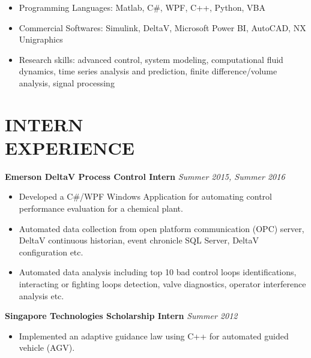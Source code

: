 \documentclass[margin, 9pt]{res}
\begin{document}
\begin{resume}
\vspace*{-2pt}
\begin{itemize}[leftmargin=*] \itemsep -4pt
	\item Programming Languages: Matlab, C\#, WPF,  C++, Python, VBA
	\item Commercial Softwares: Simulink, DeltaV, Microsoft Power BI, AutoCAD, NX Unigraphics
	\item Research skills: advanced control, system modeling, computational fluid dynamics, time series analysis and prediction, finite difference/volume analysis, signal processing
\end{itemize}


\section{INTERN\\ EXPERIENCE}

{\textbf{Emerson DeltaV Process Control Intern}} \hfill\textit{Summer 2015, Summer 2016}\\
\vspace*{-10pt}
\begin{itemize}[leftmargin=*] \itemsep -3pt
\vspace*{-5pt}
	\item Developed a C\#/WPF Windows Application for automating control performance evaluation for a chemical plant.
    \item Automated data collection from open platform communication (OPC) server, DeltaV continuous historian, event chronicle SQL Server,  DeltaV configuration etc.
	\item Automated data analysis including  top 10 bad control loops identifications, interacting or fighting  loops detection, valve diagnostics, operator interference analysis etc.
\end{itemize}

\medskip
{\textbf{Singapore Technologies Scholarship Intern}} \hfill\textit{Summer 2012}\\
\vspace*{-10pt}
\begin{itemize}[leftmargin=*] \itemsep -3pt
\vspace*{-5pt}
	\item Implemented an adaptive guidance law using C++ for automated guided vehicle (AGV).
\end{itemize}


\end{resume}
\end{document}
